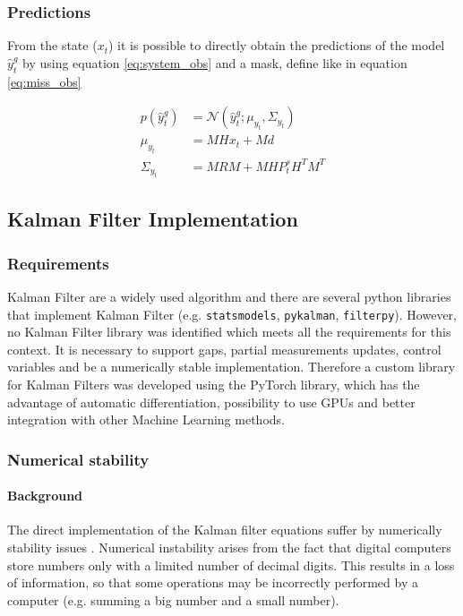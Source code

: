 \documentclass{article}
\newcommand{\norm}[3]{\mathcal{N}\left(#1; #2, #3\right)} %
\let\Oldsubsection\subsection
\renewcommand{\subsection}{\FloatBarrier\Oldsubsection}
\begin{document}
\subsubsection{Predictions}

From the state ($x_t$) it is possible to directly obtain the predictions of the model $\hat{y}^g_t$ by using equation \ref{eq:system_obs} and a mask, define like in equation \ref{eq:miss_obs}

\begin{align}\label{eq:filter_predictions}
    p(\hat{y}^g_t) &= \norm{\hat{y}^g_t}{\mu_{y_t}}{\Sigma_{y_t}} \\
    \mu_{y_t} &= MHx_t + Md \\
    \Sigma_{y_t} &= MRM + MHP^s_tH^TM^T
\end{align}


\subsection{Kalman Filter Implementation}

\subsubsection{Requirements}

Kalman Filter are a widely used algorithm and there are several python libraries that implement Kalman Filter (e.g. \verb|statsmodels|, \verb|pykalman|, \verb|filterpy|). However, no  Kalman Filter library was identified which meets all the requirements for this context. It is necessary to support gaps, partial measurements updates, control variables and be a numerically stable implementation.
Therefore a custom library for Kalman Filters was developed using the PyTorch library, which has the advantage of automatic differentiation, possibility to use GPUs and better integration with other Machine Learning methods.

\subsubsection{Numerical stability}

\paragraph{Background}
The direct implementation of the Kalman filter equations suffer by numerically stability issues \cite{mohinder_s_grewal_kalman_2001, dan_simon_optimal_2006}. %
Numerical instability arises from the fact that digital computers store numbers only with a limited number of decimal digits. This results in a loss of information, so that some operations may be incorrectly performed by a  computer (e.g. summing a big number and a small number).
\end{document}
